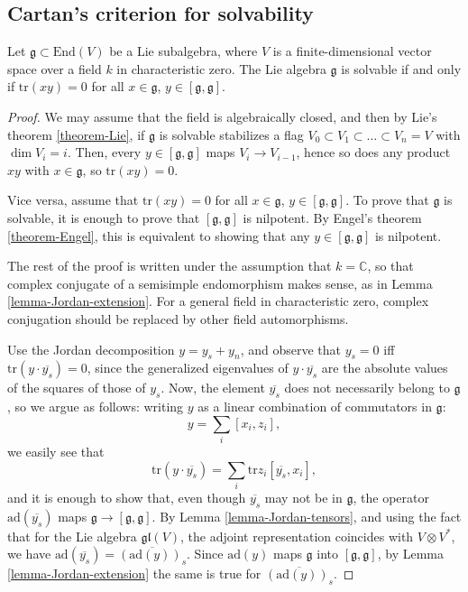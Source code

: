 \subsection{Cartan's criterion for solvability}
\label{subsection-Cartan-criterion}

\begin{theorem}
\label{theorem-Cartans-criterion}
 Let $\mathfrak g\subset \text{End}(V)$ be a Lie subalgebra, where $V$ is a finite-dimensional vector space over a field $k$ in characteristic zero. The Lie algebra $\mathfrak g$ is solvable if and only if $\text{tr}(xy)=0$ for all $x\in \mathfrak g$, $y\in [\mathfrak g, \mathfrak g]$.
 \end{theorem}

\begin{proof}
We may assume that the field is algebraically closed, and then by Lie's theorem \ref{theorem-Lie}, if $\mathfrak g$ is solvable stabilizes a flag $V_0\subset V_1\subset \dots \subset V_n=V$ with $\dim V_i=i$. Then, every $y\in [\mathfrak g,\mathfrak g]$ maps $V_i \to V_{i-1}$, hence so does any product $xy$ with $x\in \mathfrak g$, so $\text{tr}(xy)=0$.

Vice versa, assume that $\text{tr}(xy)=0$ for all $x\in \mathfrak g$, $y\in [\mathfrak g, \mathfrak g]$. To prove that $\mathfrak g$ is solvable, it is enough to prove that $[\mathfrak g,\mathfrak g]$ is nilpotent. By Engel's theorem \ref{theorem-Engel}, this is equivalent to showing that any $y\in [\mathfrak g,\mathfrak g]$ is nilpotent. 

The rest of the proof is written under the assumption that $k=\mathbb C$, so that complex conjugate of a semisimple endomorphism makes sense, as in Lemma \ref{lemma-Jordan-extension}. For a general field in characteristic zero, complex conjugation should be replaced by other field automorphisms. 

Use the Jordan decomposition $y=y_s + y_n$, and observe that $y_s=0$ iff $\text{tr}(y\cdot \overline{y_s})=0$, since the generalized eigenvalues of $y \cdot \overline{y_s}$ are the absolute values of the squares of those of $y_s$. Now, the element $\overline{y_s}$ does not necessarily belong to $\mathfrak g$, so we argue as follows: writing $y$ as a linear combination of commutators in $\mathfrak g$:
$$ y = \sum_i [x_i, z_i],$$
we easily see that 
$$ \text{tr} (y \cdot \overline{y_s}) = \sum_i \text{tr} z_i [\overline{y_s}, x_i],$$
and it is enough to show that, even though $\overline{y_s}$ may not be in $\mathfrak g$, the operator $\text{ad}(\overline{y_s})$ maps $\mathfrak g\to [\mathfrak g,\mathfrak g]$. By Lemma \ref{lemma-Jordan-tensors}, and using the fact that for the Lie algebra $\mathfrak{gl}(V)$, the adjoint representation coincides with $V\otimes V^*$, we have $\text{ad}(\overline{y_s}) = \overline{(\text{ad}(y))_s}$. Since $\text{ad}(y)$ maps $\mathfrak g$ into $[\mathfrak g,\mathfrak g]$, by Lemma \ref{lemma-Jordan-extension} the same is true for $\overline{(\text{ad}(y))_s}$.




\end{proof}

